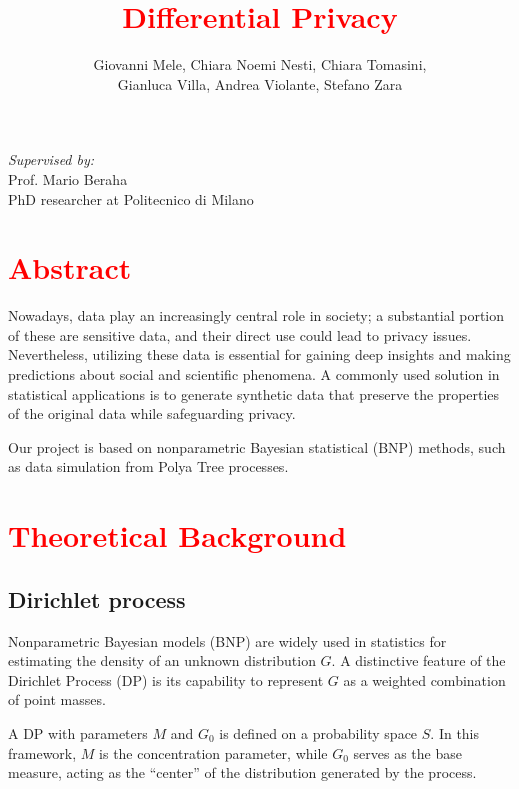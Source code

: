 \documentclass{article}
\title{\textcolor{red}{Differential Privacy}}
\author{Giovanni Mele, Chiara Noemi Nesti, Chiara Tomasini,\\
Gianluca Villa, Andrea Violante, Stefano Zara}
\date{} %
\begin{document}
\maketitle %

\begin{flushright}
\textit{Supervised by:}\\
Prof. Mario Beraha\\
PhD researcher at Politecnico di Milano
\end{flushright}


\newpage
\tableofcontents

\newpage

\section{\textcolor{red}{Abstract}}
Nowadays, data play an increasingly central role in society; a substantial portion of these are sensitive data, and their direct use could lead to privacy issues. Nevertheless, utilizing these data is essential for gaining deep insights and making predictions about social and scientific phenomena. A commonly used solution in statistical applications is to generate synthetic data that preserve the properties of the original data while safeguarding privacy.

Our project is based on nonparametric Bayesian statistical (BNP) methods, such as data simulation from Polya Tree processes.

\section{\textcolor{red}{Theoretical Background\textsuperscript{\cite{libro}}}}
\subsection{Dirichlet process}

Nonparametric Bayesian models (BNP) are widely used in statistics for estimating the density of an unknown distribution \( G \). A distinctive feature of the Dirichlet Process (DP) is its capability to represent \( G \) as a weighted combination of point masses.
\medskip

A DP with parameters \( M \) and \( G_0 \) is defined on a probability space \( S \). In this framework, \( M \) is the concentration parameter, while \( G_0 \) serves as the base measure, acting as the ``center'' of the distribution generated by the process.
\end{document}
